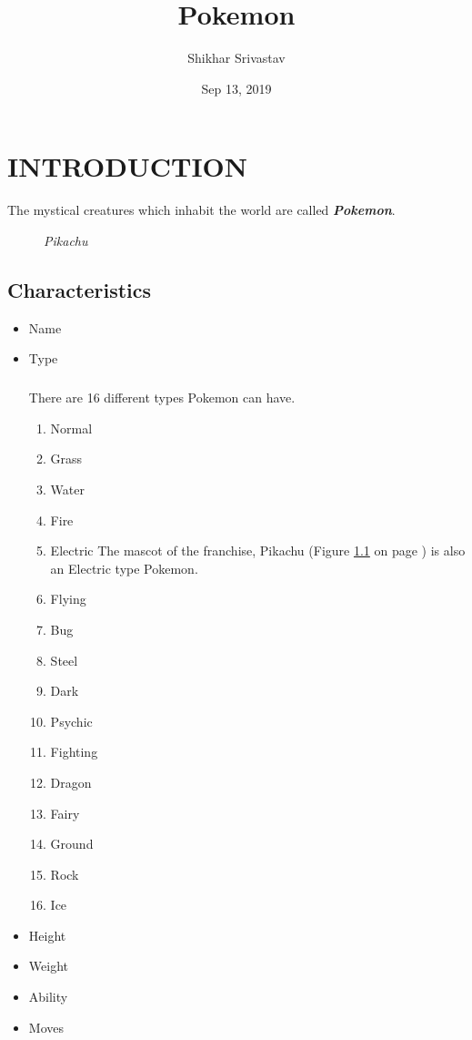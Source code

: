 \documentclass{report}
\begin{document}
\title{Pokemon}
\author{Shikhar Srivastav}
\date{Sep 13, 2019}
\maketitle
\newpage
\tableofcontents
\newpage
{}
\chapter{INTRODUCTION}
The mystical creatures which inhabit the world are called \large \textbf{\textsl{Pokemon}}.
\begin{figure}[p]
\centering
\caption{\textit{Pikachu}}
\label{Fig:Figure1}
\end{figure}
\section{Characteristics}
\begin{itemize}
\item Name
\item Type \newline
\paragraph{}
There are 16 different types Pokemon can have.
\begin{enumerate}
\item Normal
\item Grass
\item Water
\item Fire
\item Electric\newline
The mascot of the franchise, Pikachu (Figure \ref{Fig:Figure1} on page \pageref{Fig:Figure1}) is also an Electric type Pokemon.
\item Flying
\item Bug
\item Steel
\item Dark
\item Psychic
\item Fighting
\item Dragon
\item Fairy
\item Ground
\item Rock
\item Ice
\end{enumerate}
\item Height
\item Weight
\item Ability
\item Moves
\end{itemize}
\end{document}
